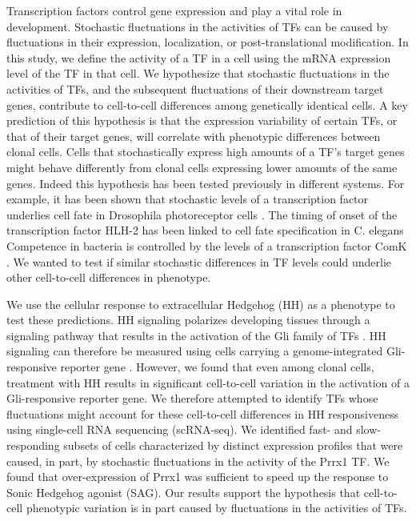 Transcription factors control gene expression and play a vital role in development. Stochastic fluctuations in the activities of TFs can be caused by fluctuations in their expression, localization, or post-translational modification. In this study, we define the activity of a TF in a cell using the mRNA expression level of the TF in that cell. We hypothesize that stochastic fluctuations in the activities of TFs, and the subsequent fluctuations of their downstream target genes, contribute to cell-to-cell differences among genetically identical cells. A key prediction of this hypothesis is that the expression variability of certain TFs, or that of their target genes, will correlate with phenotypic differences between clonal cells. Cells that stochastically express high amounts of a TF’s target genes might behave differently from clonal cells expressing lower amounts of the same genes. Indeed this hypothesis has been tested previously in different systems. For example, it has been shown that stochastic levels of a transcription factor underlies cell fate in Drosophila photoreceptor cells \cite{Wernet2006-rg}. The timing of onset of the transcription factor HLH-2 has been linked to cell fate specification in C. elegans \cite{Attner2019-lh} Competence in bacteria is controlled by the levels of a transcription factor ComK \cite{Samoilov2006-gh}\cite{Suel2006-pw}.  We wanted to test if similar stochastic differences in TF levels could underlie other cell-to-cell differences in phenotype.

We use the cellular response to extracellular Hedgehog (HH) as a phenotype to test these predictions. HH signaling polarizes developing tissues through a signaling pathway that results in the activation of the Gli family of TFs \cite{Kong2019-wo,Briscoe2013-ze,Lee2016-bf}. HH signaling can therefore be measured using cells carrying a genome-integrated Gli-responsive reporter gene \cite{Pusapati2018-gs}. However, we found that even among clonal cells, treatment with HH results in significant cell-to-cell variation in the activation of a Gli-responsive reporter gene. We therefore attempted to identify TFs whose fluctuations might account for these cell-to-cell differences in HH responsiveness using single-cell RNA sequencing (scRNA-seq). We identified fast- and slow-responding subsets of cells characterized by distinct expression profiles that were caused, in part, by stochastic fluctuations in the activity of the Prrx1 TF.  We found that over-expression of Prrx1 was sufficient to speed up the response to Sonic Hedgehog agonist (SAG). Our results support the hypothesis that cell-to-cell phenotypic variation is in part caused by fluctuations in the activities of TFs.

